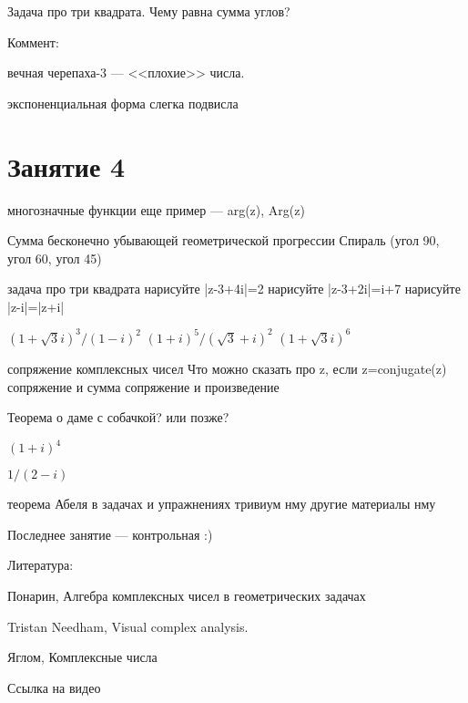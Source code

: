 \documentclass[12pt,a4paper]{article}
\begin{document}
Задача про три квадрата. Чему равна сумма углов?




Коммент: 

вечная черепаха-3 --- <<плохие>> числа.

экспоненциальная форма слегка подвисла


\section{Занятие 4}


многозначные функции
еще пример --- arg(z), Arg(z)







Сумма бесконечно убывающей геометрической прогрессии
Спираль (угол 90, угол 60, угол 45)

задача про три квадрата
нарисуйте |z-3+4i|=2
нарисуйте |z-3+2i|=i+7
нарисуйте |z-i|=|z+i|

$(1+\sqrt{3}i)^3/(1-i)^2$
$(1+i)^5/(\sqrt{3}+i)^2$
$(1+\sqrt{3}i)^6$

сопряжение комплексных чисел
Что можно сказать про z, если z=conjugate(z)
сопряжение и сумма
сопряжение и произведение


Теорема о даме с собачкой? или позже?



$(1+i)^4$


$1/(2-i)$

теорема Абеля в задачах и упражнениях
тривиум нму
другие материалы нму



Последнее занятие --- контрольная :)


Литература:

Понарин, Алгебра комплексных чисел в геометрических задачах

Tristan Needham, Visual complex analysis.

Яглом, Комплексные числа

Ссылка на видео
\end{document}
